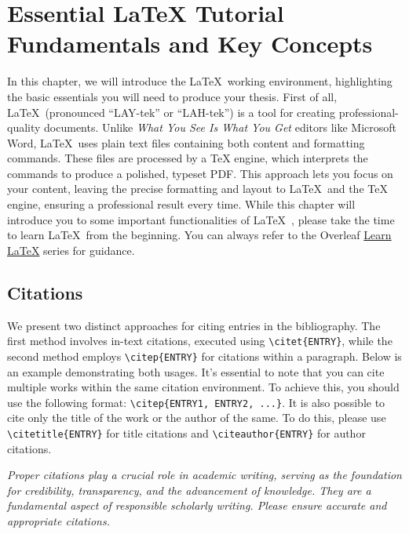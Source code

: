 \chapter[Essential LaTeX Tutorial: Fundamentals and Key Concepts]{Essential LaTeX Tutorial Fundamentals and Key Concepts}
\label{cp:latex-tutorial}

{
	\parindent0pt

	In this chapter, we will introduce the \LaTeX~working environment, highlighting the basic essentials you will need to produce your thesis. First of all, \LaTeX~(pronounced ``LAY-tek'' or ``LAH-tek'') is a tool for creating professional-quality documents. Unlike \textit{What You See Is What You Get} editors like Microsoft Word, \LaTeX~uses plain text files containing both content and formatting commands. These files are processed by a TeX engine, which interprets the commands to produce a polished, typeset PDF. This approach lets you focus on your content, leaving the precise formatting and layout to \LaTeX~and the TeX engine, ensuring a professional result every time. While this chapter will introduce you to some important functionalities of \LaTeX~, please take the time to learn \LaTeX~from the beginning. You can always refer to the Overleaf \href{https://www.overleaf.com/learn/latex/Learn_LaTeX_in_30_minutes}{Learn LaTeX} series for guidance.


	\section{Citations}
	\label{sec:citations}
	We present two distinct approaches for citing entries in the bibliography. The first method involves in-text citations, executed using \verb|\citet{ENTRY}|, while the second method employs \verb|\citep{ENTRY}| for citations within a paragraph. Below is an example demonstrating both usages. It's essential to note that you can cite multiple works within the same citation environment. To achieve this, you should use the following format: \verb|\citep{ENTRY1, ENTRY2, ...}|. It is also possible to cite only the title of the work or the author of the same. To do this, please use \verb|\citetitle{ENTRY}| for title citations and \verb|\citeauthor{ENTRY}| for author citations.

	\begin{block}[tip]
		\textit{Proper citations play a crucial role in academic writing, serving as the foundation for credibility, transparency, and the advancement of knowledge. They are a fundamental aspect of responsible scholarly writing. Please ensure accurate and appropriate citations.}
	\end{block}

}
